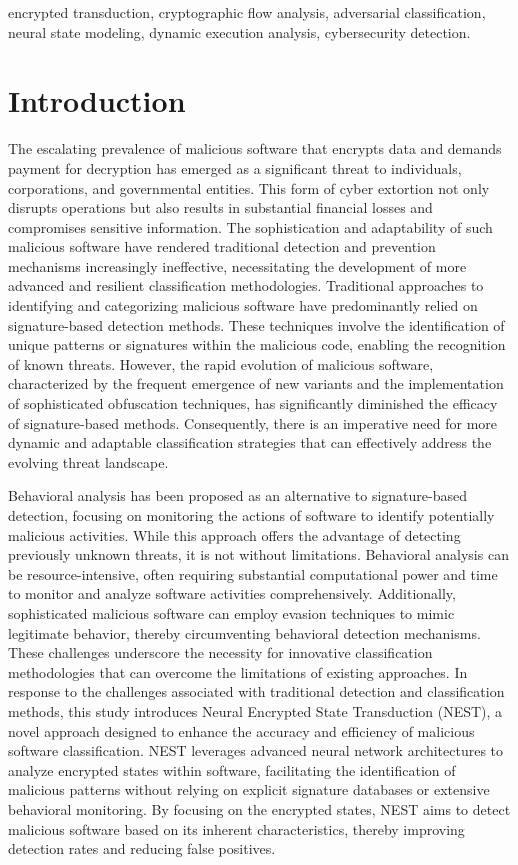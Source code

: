 \documentclass[lettersize,journal]{IEEEtran}
\begin{document}
\begin{IEEEkeywords}
encrypted transduction, cryptographic flow analysis, adversarial classification, neural state modeling, dynamic execution analysis, cybersecurity detection.
\end{IEEEkeywords}



\section{Introduction}
The escalating prevalence of malicious software that encrypts data and demands payment for decryption has emerged as a significant threat to individuals, corporations, and governmental entities. This form of cyber extortion not only disrupts operations but also results in substantial financial losses and compromises sensitive information. The sophistication and adaptability of such malicious software have rendered traditional detection and prevention mechanisms increasingly ineffective, necessitating the development of more advanced and resilient classification methodologies. Traditional approaches to identifying and categorizing malicious software have predominantly relied on signature-based detection methods. These techniques involve the identification of unique patterns or signatures within the malicious code, enabling the recognition of known threats. However, the rapid evolution of malicious software, characterized by the frequent emergence of new variants and the implementation of sophisticated obfuscation techniques, has significantly diminished the efficacy of signature-based methods. Consequently, there is an imperative need for more dynamic and adaptable classification strategies that can effectively address the evolving threat landscape.

Behavioral analysis has been proposed as an alternative to signature-based detection, focusing on monitoring the actions of software to identify potentially malicious activities. While this approach offers the advantage of detecting previously unknown threats, it is not without limitations. Behavioral analysis can be resource-intensive, often requiring substantial computational power and time to monitor and analyze software activities comprehensively. Additionally, sophisticated malicious software can employ evasion techniques to mimic legitimate behavior, thereby circumventing behavioral detection mechanisms. These challenges underscore the necessity for innovative classification methodologies that can overcome the limitations of existing approaches. In response to the challenges associated with traditional detection and classification methods, this study introduces Neural Encrypted State Transduction (NEST), a novel approach designed to enhance the accuracy and efficiency of malicious software classification. NEST leverages advanced neural network architectures to analyze encrypted states within software, facilitating the identification of malicious patterns without relying on explicit signature databases or extensive behavioral monitoring. By focusing on the encrypted states, NEST aims to detect malicious software based on its inherent characteristics, thereby improving detection rates and reducing false positives.
\end{document}
